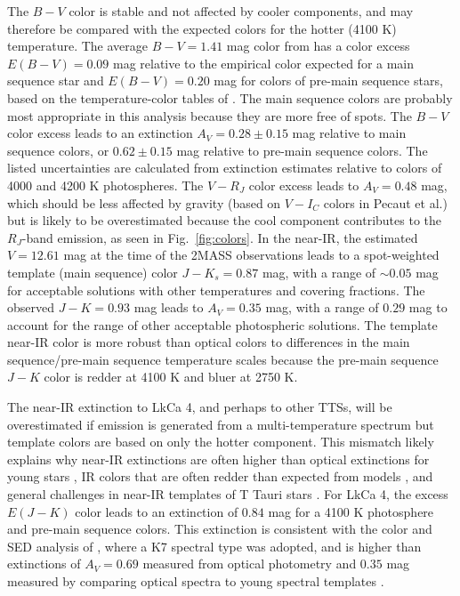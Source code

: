\documentclass[twocolumn]{emulateapj}%
\begin{document}
The $B-V$ color is stable and not affected by cooler components, and may therefore be compared with the expected colors for the hotter (4100 K) temperature.  
The average $B-V=1.41$ mag color from \citet{grankin08} has a color excess $E(B-V)=0.09$ mag relative to the empirical color expected for a main sequence star and $E(B-V)=0.20$ mag for colors of pre-main sequence stars, based on the temperature-color tables of \citep{pecaut13}.  The main sequence colors are probably most 
appropriate in this analysis because they are more free of spots.  
The $B-V$ color 
excess leads to an extinction $A_V=0.28\pm0.15$ mag relative to main sequence colors, or $0.62\pm0.15$ mag relative to 
pre-main sequence colors.   The listed uncertainties are calculated from extinction estimates relative to colors of 4000 and 4200 K photospheres.
The $V-R_J$ color excess leads to $A_V=0.48$ mag, which should be less affected by gravity (based on $V-I_C$ colors in Pecaut et al.) but is likely to be overestimated because the cool component contributes to the $R_J$-band emission, as seen in Fig.~\ref{fig:colors}.
In the near-IR, the estimated $V=12.61$ mag at the time of the 2MASS observations leads to a spot-weighted template (main sequence) color 
$J-K_s=0.87$ mag, with a range of $\sim 0.05$ mag for acceptable solutions with other 
temperatures and covering fractions. The observed $J-K=0.93$ mag leads to $A_V=0.35$ mag, 
with a range of $0.29$ mag to account for the range of other acceptable photospheric solutions.  
The template near-IR color is more robust than optical colors to differences 
in the main sequence/pre-main sequence temperature scales because the pre-main 
sequence $J-K$ color is redder at 4100 K and bluer at 2750 K.  

The near-IR extinction to LkCa 4, and perhaps to other TTSs, will be overestimated if emission is generated from a multi-temperature spectrum but template colors are based on only the hotter component.  This mismatch likely explains why near-IR extinctions are often higher than optical extinctions for young stars \citep{herczeg14}, IR colors that are often redder than expected from models \citep{tottle15}, and general challenges in near-IR templates of T Tauri stars \citep[e.g.][]{espaillat10,fischer11}.  For LkCa 4, the excess $E(J-K)$ color leads to an extinction of $0.84$ mag for a 4100 K photosphere and \citet{pecaut13} pre-main sequence colors.  This extinction is consistent with the color and SED analysis of \citet{furlan06}, where a K7 spectral type was adopted, and is higher than extinctions of $A_V=0.69$ measured from optical photometry \citep{kenyon95} and $0.35$ mag measured by comparing optical spectra to young spectral templates \citep{herczeg14}.  
\end{document}
